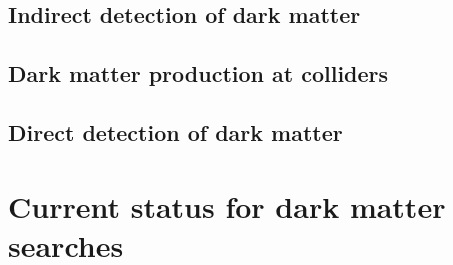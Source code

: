 \subsection{Indirect detection of dark matter}\label{sec:DMOverview/IndirectDM}

\subsection{Dark matter production at colliders}\label{sec:DMOverview/DMProdColliders}

\subsection{Direct detection of dark matter}\label{sec:DMOverview/DirectDetection}

\section{Current status for dark matter searches}\label{sec:DMOverview/DMCurrentStatus}